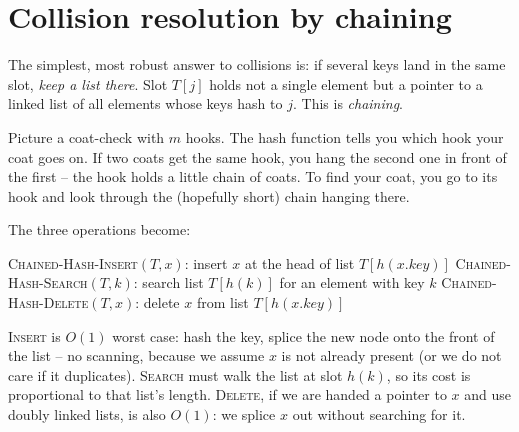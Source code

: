 \section{Collision resolution by chaining}

The simplest, most robust answer to collisions is: if several keys land in the same slot, \emph{keep a list there}. Slot $T[j]$ holds not a single element but a pointer to a linked list of all elements whose keys hash to $j$. This is \emph{chaining}.

\begin{intuitionbox}
Picture a coat-check with $m$ hooks. The hash function tells you which hook your coat goes on. If two coats get the same hook, you hang the second one in front of the first -- the hook holds a little chain of coats. To find your coat, you go to its hook and look through the (hopefully short) chain hanging there.
\end{intuitionbox}

The three operations become:

\begin{algorithm}[H]
\caption{Chained hash table operations}
\textsc{Chained-Hash-Insert}$(T,x)$: insert $x$ at the head of list $T[h(x.key)]$\;
\textsc{Chained-Hash-Search}$(T,k)$: search list $T[h(k)]$ for an element with key $k$\;
\textsc{Chained-Hash-Delete}$(T,x)$: delete $x$ from list $T[h(x.key)]$\;
\end{algorithm}

\textsc{Insert} is $O(1)$ worst case: hash the key, splice the new node onto the front of the list -- no scanning, because we assume $x$ is not already present (or we do not care if it duplicates). \textsc{Search} must walk the list at slot $h(k)$, so its cost is proportional to that list's length. \textsc{Delete}, if we are handed a pointer to $x$ and use doubly linked lists, is also $O(1)$: we splice $x$ out without searching for it.

